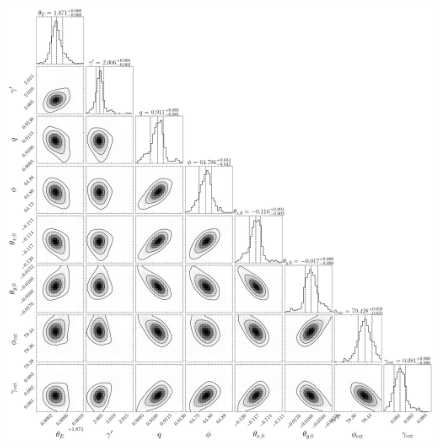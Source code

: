 \documentclass[times,10pt,twocolumn]{article}
\begin{document}
\begin{figure}[ht]
        \centering
        \includegraphics[width=\textwidth]{lens_params_corner_plot}
        \caption{}
        \label{fig:cornerplot}
\end{figure}
\end{document}
